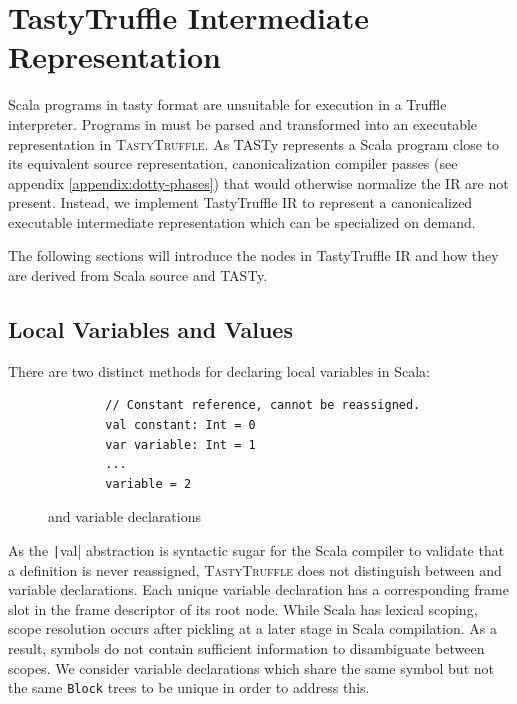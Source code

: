 \section{TastyTruffle Intermediate Representation}

Scala programs in \acrshort{tasty} format are unsuitable for execution in a Truffle interpreter. Programs in must be parsed and transformed into an executable representation in \textsc{TastyTruffle}. As TASTy represents a Scala program close to its equivalent source representation, canonicalization compiler passes (see appendix \ref{appendix:dotty-phases}) that would otherwise normalize the IR are not present. Instead, we implement TastyTruffle IR to represent a canonicalized executable intermediate representation which can be specialized on demand. 


The following sections will introduce the nodes in TastyTruffle IR and how they are derived from Scala source and TASTy.


\subsection*{Local Variables and Values} 

There are two distinct methods for declaring local variables in Scala:

\begin{figure}[H]
	\begin{verbatim}
		// Constant reference, cannot be reassigned.
		val constant: Int = 0 
		var variable: Int = 1
		...
		variable = 2
	\end{verbatim} 
	\caption{ and  variable declarations}
\end{figure}

As the \texttt|val| abstraction is syntactic sugar\cite{mechanical-eval-of-exprs} for the Scala compiler to validate that a  definition is never reassigned, 
\textsc{TastyTruffle} does not distinguish between  and  variable declarations. Each unique variable declaration 
has a corresponding frame slot in the frame descriptor of its root node. While Scala has lexical scoping\cite{scala:lang-spec}, scope resolution occurs after pickling at a later stage in Scala compilation.
As a result, symbols do not contain sufficient information to disambiguate between scopes. We consider variable declarations which share the same symbol but not the same \texttt{Block} trees 
to be unique in order to address this.

